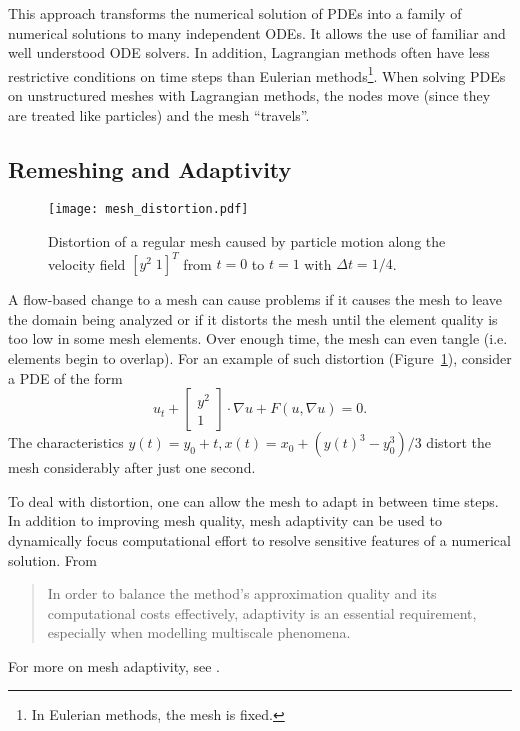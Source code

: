 \documentclass[letterpaper,10pt]{article}
\theoremstyle{definition}
\begin{document}
This approach transforms the numerical solution of PDEs into a family of
numerical solutions to many independent ODEs. It allows the use of familiar
and well understood ODE solvers. In addition, Lagrangian methods often
have less restrictive conditions on time steps than Eulerian
methods\footnote{In Eulerian methods, the mesh is fixed.}.
When solving PDEs on unstructured meshes
with Lagrangian methods, the nodes move (since they
are treated like particles) and the mesh ``travels''.

\subsection{Remeshing and Adaptivity}

\begin{figure}
  \texttt{[image: mesh\_distortion.pdf]}
  \centering
  \captionsetup{width=.75\linewidth}
  \caption{Distortion of a regular mesh caused by particle motion along
    the velocity field \(\left[ y^2 \; 1 \right]^T\) from \(t = 0\)
    to \(t = 1\) with \(\Delta t = 1/4\).}
  \label{fig:mesh-distortion}
\end{figure}

A flow-based change to a mesh can cause problems if it causes the mesh to
leave the domain being analyzed or if it distorts the mesh until the element
quality is too low in some mesh elements. Over enough time, the mesh can
even tangle (i.e. elements begin to overlap).
For an example of such distortion (Figure~\ref{fig:mesh-distortion}),
consider a PDE of the form
\begin{equation}\label{eq:non-rigid-characteristics}
u_t + \left[ \begin{array}{c} y^2 \\ 1 \end{array}\right] \cdot \nabla u +
  F\left(u, \nabla u\right) = 0.
\end{equation}
The characteristics \(y(t) = y_0 + t, x(t) = x_0 +
\left(y(t)^3 - y_0^3\right)/3\)
distort the mesh considerably after just one second.

To deal with distortion, one can allow the mesh to adapt in between time
steps. In addition to improving mesh quality, mesh
adaptivity can be used to dynamically focus computational effort to resolve
sensitive features of a numerical solution. From \cite{Iske2004}
\begin{quote}
{\small In order to balance the method's approximation quality and its
computational costs effectively, adaptivity is an essential requirement,
especially when modelling multiscale phenomena.}
\end{quote}
For more on mesh adaptivity, see \cite{Babuska1978, Peraire1987, Pain2001}.
\end{document}
